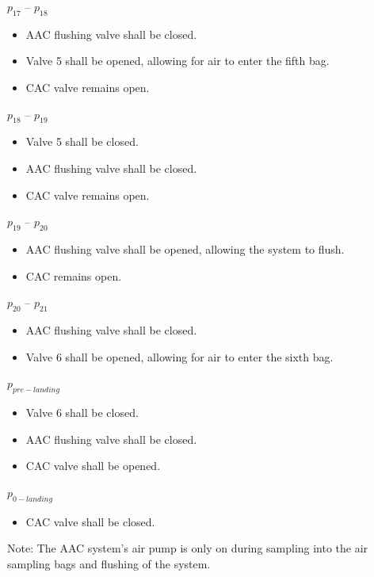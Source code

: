 $p_{17}$ – $p_{18}$
\begin{itemize}
    \item AAC flushing valve shall be closed.
    \item Valve 5 shall be opened, allowing for air to enter the fifth bag. 
    \item CAC valve remains open.
\end{itemize}

$p_{18}$ – $p_{19}$
\begin{itemize}
    \item Valve 5 shall be closed.
    \item AAC flushing valve shall be closed.
    \item CAC valve remains open.
\end{itemize}

$p_{19}$ – $p_{20}$
\begin{itemize}
     \item AAC flushing valve shall be opened, allowing the system to flush. 
    \item CAC remains open.
   \end{itemize}

$p_{20}$ – $p_{21}$
\begin{itemize}
    \item AAC flushing valve shall be closed.
    \item Valve 6 shall be opened, allowing for air to enter the sixth bag.
\end{itemize}

$p_{pre-landing}$ 
\begin{itemize}
    \item Valve 6 shall be closed.
    \item AAC flushing valve shall be closed.
    \item CAC valve shall be opened.
\end{itemize}

$p_{0-landing}$
\begin{itemize}
    \item CAC valve shall be closed.
\end{itemize}


Note: The AAC system's air pump is only on during sampling into the air sampling bags and flushing of the system.


\raggedbottom